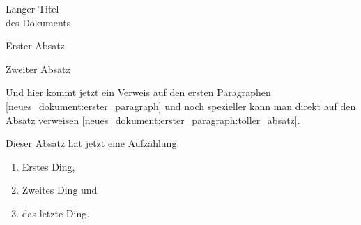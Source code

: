 


\begin{jurdoc}[Kurztitel]{Langer Titel\\des Dokuments}

\label{neues_dokument:erster_paragraph}
Erster Absatz

Zweiter Absatz\label{neues_dokument:erster_paragraph:toller_absatz}


\label{neues_dokument:anderer_paragraph}
Und hier kommt jetzt ein Verweis auf den ersten Paragraphen \ref{neues_dokument:erster_paragraph} und noch spezieller kann man direkt auf den Absatz verweisen \ref{neues_dokument:erster_paragraph:toller_absatz}.

Dieser Absatz hat jetzt eine Aufzählung:
\begin{enumerate}
	\item Erstes Ding,
	\item Zweites Ding und
	\item das letzte Ding.
\end{enumerate}



\end{jurdoc}
